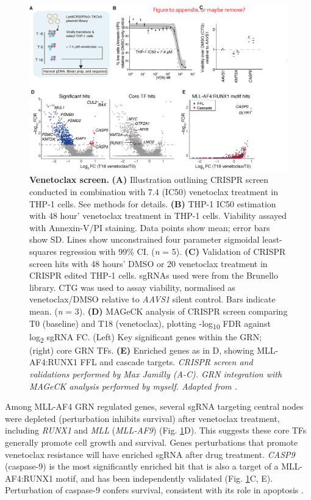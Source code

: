 \begin{figure}[h]
    \centering
    \includegraphics[width=\textwidth,height=\textheight,keepaspectratio]{figures/chapter4/ch4_max.png}
    \caption[{Venetoclax screen.}]
    {\textbf{Venetoclax screen.} 
    \textbf{(A)} Illustration outlining CRISPR screen conducted in combination with 7.4 \microm{} (IC50) venetoclax treatment in THP-1 cells. See methods for details. 
    \textbf{(B)} THP-1 IC50 estimation with 48 hour' venetoclax treatment in THP-1 cells. Viability assayed with Annexin-V/PI staining. Data points show mean; error bars show SD. Lines show unconstrained four parameter sigmoidal least-squares regression with 99\% CI. (\textit{n} = 5). 
    \textbf{(C)} Validation of CRISPR screen hits with 48 hours' DMSO or 20 \microm{} venetoclax treatment in CRISPR edited THP-1 cells. sgRNAs used were from the Brunello library. CTG was used to assay viability, normalised as venetoclax/DMSO relative to \textit{AAVS1} silent control. Bars indicate mean. (\textit{n} = 3). 
    \textbf{(D)} MAGeCK analysis of CRISPR screen comparing T0 (baseline) and T18 (venetoclax), plotting -log\textsubscript{10} FDR against log\textsubscript{2} sgRNA FC. (Left) Key significant genes within the GRN; (right) core GRN TFs. 
    \textbf{(E)} Enriched genes as in D, showing MLL-AF4:RUNX1 FFL and cascade targets. 
    \textit{CRISPR screen and validations performed by Max Jamilly (A-C). GRN integration with MAGeCK analysis performed by myself. Adapted from \cite{harman_kmt2a-aff1_2021}.}
    }
    \label{fig:ch4_max}
\end{figure}

Among MLL-AF4 GRN regulated genes, several sgRNA targeting central nodes were depleted (perturbation inhibits survival) after venetoclax treatment, including \textit{RUNX1} and \textit{MLL} (\textit{MLL-AF9}) (Fig. \ref{fig:ch4_max}D). This suggests these core TFs generally promote cell growth and survival. Genes perturbations that promote venetoclax resistance will have enriched sgRNA after drug treatment. \textit{CASP9} (caspase-9) is the most significantly enriched hit that is also a target of a MLL-AF4:RUNX1 motif, and has been independently validated (Fig. \ref{fig:ch4_max}C, E). Perturbation of caspase-9 confers survival, consistent with its role in apoptosis \citep{li_caspases_2008, li_cytochrome_1997, slee_ordering_1999}. 

